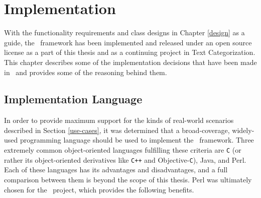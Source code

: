 \chapter{Implementation}
\label{Implementation}

With the functionality requirements and class designs in Chapter
\ref{design} as a guide, the \aicat\ framework has been implemented
and released under an open source license\cite{raymond:97,dibona:99} as a
part of this thesis and as a continuing project in Text
Categorization.  This chapter describes some of the implementation
decisions that have been made in \aicat\, and provides some of the
reasoning behind them.

\section{Implementation Language}

In order to provide maximum support for the kinds of real-world
scenarios described in Section \ref{use-cases}, it was determined that
a broad-coverage, widely-used programming language should be used to
implement the \aicat\ framework.  Three extremely common
object-oriented languages fulfilling these criteria are \texttt{C} (or
rather its object-oriented derivatives like \texttt{C++} and
Objective-\texttt{C}), Java, and Perl.  Each of these languages has
its advantages and disadvantages, and a full comparison between them
is beyond the scope of this thesis.  Perl was ultimately chosen for
the \aicat\ project, which provides the following benefits.

